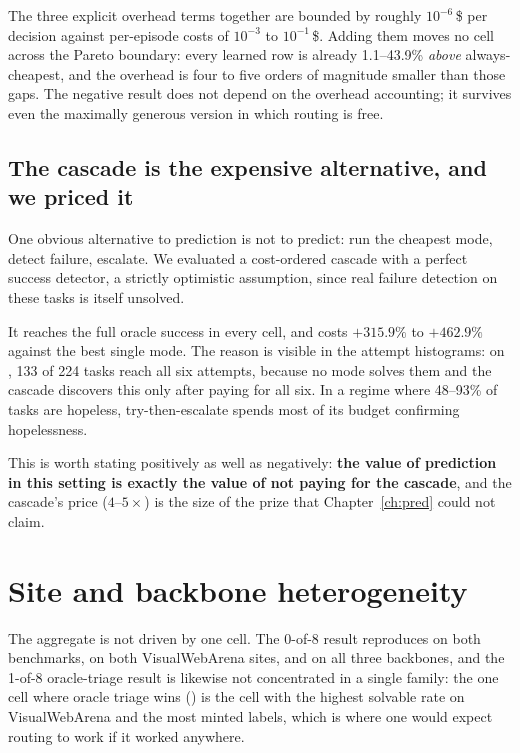 The three explicit overhead terms together are bounded by roughly $10^{-6}$\,\$
per decision against per-episode costs of $10^{-3}$ to $10^{-1}$\,\$. Adding
them moves no cell across the Pareto boundary: every learned row is already
1.1--43.9\% \emph{above} always-cheapest, and the overhead is four to five
orders of magnitude smaller than those gaps. The negative result does not depend
on the overhead accounting; it survives even the maximally generous version in
which routing is free.

\subsection{The cascade is the expensive alternative, and we priced it}

One obvious alternative to prediction is not to predict: run the cheapest mode,
detect failure, escalate. We evaluated a cost-ordered cascade with a perfect success detector, a strictly optimistic assumption, since real failure
detection on these tasks is itself unsolved.

It reaches the full oracle success in every cell, and costs $+315.9\%$ to
$+462.9\%$ against the best single mode. The reason is visible in the attempt
histograms: on , 133 of 224 tasks reach all six attempts,
because no mode solves them and the cascade discovers this only after paying for
all six. In a regime where 48--93\% of tasks are hopeless, try-then-escalate
spends most of its budget confirming hopelessness.

This is worth stating positively as well as negatively: \textbf{the value of
prediction in this setting is exactly the value of not paying for the cascade},
and the cascade's price ($4$--$5\times$) is the size of the prize that
Chapter~\ref{ch:pred} could not claim.

\FloatBarrier
\section{Site and backbone heterogeneity}
\label{sec:heterogeneity}

The aggregate is not driven by one cell. The 0-of-8 result reproduces on both benchmarks, on both VisualWebArena sites, and on all three backbones, and the
1-of-8 oracle-triage result is likewise not concentrated in a single family: the one cell where oracle triage wins () is the cell with the highest
solvable rate on VisualWebArena and the most minted labels, which is where
one would expect routing to work if it worked anywhere.

